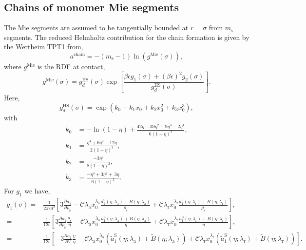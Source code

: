 \documentclass[english]{../thermomemo/thermomemo}
\newcommand*{\pd}[3][]{\frac{\partial^{#1}#2}{\partial{#3}^{#1}}}%
\newcommand*{\lb}{\left(}
\newcommand*{\rb}{\right)}
\newcommand{\mie}{\text{Mie}\xspace}
\newcommand{\hs}{\text{HS}\xspace}
\newcommand{\chain}{\ensuremath{\text{chain}}\xspace}
\newcommand{\seg}{\ensuremath{\text{s}}\xspace}
\newcommand{\lama}{\ensuremath{{\lambda_{\text{a}}}}\xspace}
\newcommand{\lamr}{\ensuremath{{\lambda_{\text{r}}}}\xspace}
\newcommand{\aS}{\ensuremath{a_{1}^{\text{S}}}\xspace}
\newcommand{\aSt}{\ensuremath{\tilde{a}_{1}^{\text{S}}}\xspace}
\newcommand{\Bt}{\ensuremath{\tilde{B}}\xspace}
\begin{document}
\subsection{Chains of monomer Mie segments}
The Mie segments are assumed to be tangentially bounded at $r=\sigma$ from $m_\seg$ segments. The reduced Helmholtz contribution for the chain formation is given by the Wertheim TPT1 from,
\begin{equation}
  \label{eq:a_chain}
  a^\chain = -\lb m_\seg -1\rb \ln \lb g^\mie \lb \sigma \rb \rb,
\end{equation}
where $g^\mie$ is the RDF at contact,
\begin{equation}
  \label{eq:g_mie}
  g^\mie \lb \sigma \rb = g^\hs_d \lb \sigma \rb \exp \left[ \frac{\beta \epsilon g_1 \lb \sigma \rb + \lb \beta \epsilon \rb^2 g_2 \lb \sigma \rb}{g^\hs_d \lb \sigma \rb} \right].
\end{equation}
Here,
\begin{equation}
  \label{eq:g_hs}
  g^\hs_d \lb \sigma \rb = \exp \lb k_0 + k_1 x_0 + k_2 x_0^2 + k_3 x_0^3\rb,
\end{equation}
with
\begin{align}
  \label{eq:k_0}
  k_0 &= - \ln \lb 1- \eta\rb + \frac{42\eta - 39\eta^2 + 9 \eta^3 - 2 \eta^4}{6 \lb 1- \eta\rb^3},\\
  \label{eq:k_1}
  k_1 &= \frac{ \eta^4 + 6 \eta^2 -12 \eta}{2 \lb 1- \eta\rb^3},\\
  \label{eq:k_2}
  k_2 &= \frac{-3 \eta^2}{8 \lb 1- \eta\rb^2},\\
  \label{eq:k_3}
  k_3 &= \frac{-\eta^4 + 3 \eta^2 + \ 3 \eta}{6 \lb 1- \eta\rb^3}.
\end{align}
For $g_1$ we have,
\begin{align}
  \label{eq:g_1}
  g_1 \lb \sigma \rb =& \frac{1}{2 \pi \epsilon d^3} \left[3 \pd{a_1}{\rho_\seg}
    - \mathcal{C} \lama x_0^\lama \frac{\aS\lb \eta; \lama\rb + B\lb\eta;\lama \rb}{\rho_\seg}
                        + \mathcal{C} \lamr x_0^\lamr \frac{\aS\lb \eta; \lamr\rb + B\lb\eta;\lamr \rb}{\rho_\seg}\right],\nonumber \\
  =& \frac{1}{12 \epsilon} \left[3 \pd{a_1}{\rho_\seg}\frac{\rho_\seg}{\eta}
    - \mathcal{C} \lama x_0^\lama \frac{\aS\lb \eta; \lama\rb + B\lb\eta;\lama \rb}{\eta}
     + \mathcal{C} \lamr x_0^\lamr \frac{\aS\lb \eta; \lamr\rb + B\lb\eta;\lamr \rb}{\eta}\right],\nonumber\\
    =& \frac{1}{12 \epsilon} \left[-3 \pd{a_1}{V}\frac{V}{\eta}
    - \mathcal{C} \lama x_0^\lama \lb\aSt\lb \eta; \lama\rb + \Bt\lb\eta;\lama \rb \rb
  + \mathcal{C} \lamr x_0^\lamr \lb \aSt\lb \eta; \lamr\rb + \Bt\lb\eta;\lamr \rb\rb\right].
\end{align}
\end{document}
